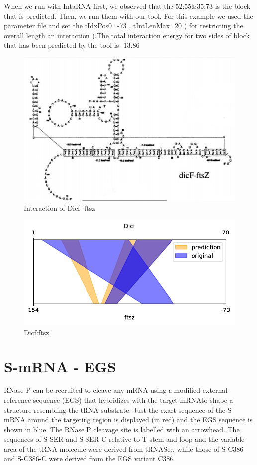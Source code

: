 \documentclass[twoside,a4paper]{report}
\begin{document}
	When we run with IntaRNA first, we observed that the 52:55\&35:73 is the block that is predicted. Then, we run them with our tool. For this example we used the parameter file and set the tIdxPos0=-73 , tIntLenMax=20 ( for restricting the overall length an interaction ).The total interaction energy for two sides of block that has been predicted by the tool is -13.86 \\
	
		\begin{figure}[h!tb]
		\includegraphics[width=1.0\linewidth]{dicf}
		\centering
		\caption{ Interaction of Dicf- ftsz } 
		\label{fig:dicf}
	\end{figure}

\begin{figure}[h!tb]
	\centering
	\includegraphics[width=.4\linewidth]{rricomparison3}
	\caption{Dicf:ftsz}
	\label{fig:rricomparison3}
\end{figure}

\clearpage
	\section{S-mRNA - EGS }
	
	 RNase P can be recruited to cleave any mRNA using a modified external reference sequence (EGS) that hybridizes with the target mRNAto shape a structure resembling the tRNA substrate. Just the exact sequence of the S mRNA around the targeting region is displayed (in red) and the EGS sequence is shown in blue. The RNase P cleavage site is labelled with an arrowhead. The sequences of S-SER and S-SER-C relative to T-stem and loop and the variable area of the tRNA molecule were derived from tRNASer, while those of S-C386 and S-C386-C were derived from the EGS variant C386.\\
	 
\end{document}
